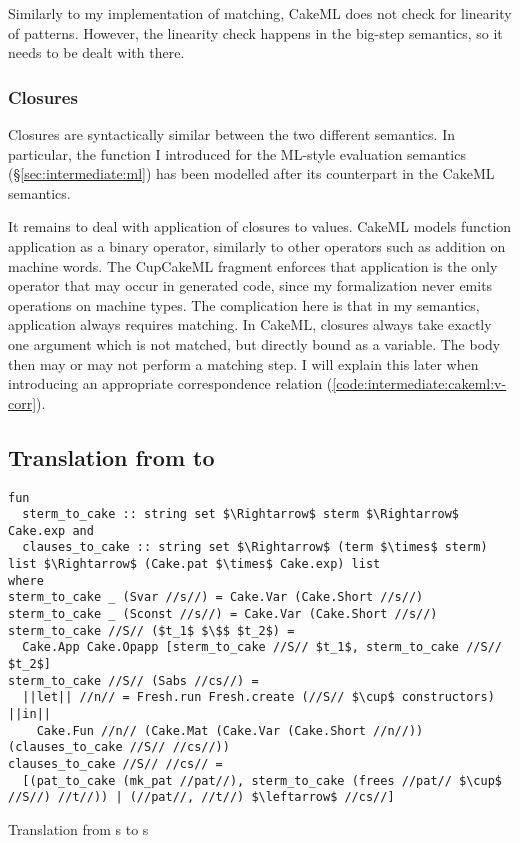 Similarly to my implementation of matching, CakeML does not check for linearity of patterns.
However, the linearity check happens in the big-step semantics, so it needs to be dealt with there.

\subsubsection{Closures}

Closures are syntactically similar between the two different semantics.
In particular, the  function I introduced for the ML-style evaluation semantics (§\ref{sec:intermediate:ml}) has been modelled after its counterpart in the CakeML semantics.

It remains to deal with application of closures to values.
CakeML models function application as a binary operator, similarly to other operators such as addition on machine words.
The CupCakeML fragment enforces that application is the only operator that may occur in generated code, since my formalization never emits operations on machine types.
The complication here is that in my semantics, application always requires matching.
In CakeML, closures always take exactly one argument which is not matched, but directly bound as a variable.
The body then may or may not perform a matching step.
I will explain this later when introducing an appropriate correspondence relation (\cref{code:intermediate:cakeml:v-corr}).

\subsection{Translation from  to }

\begin{code}
  \begin{lstlisting}[language=Isabelle]
fun
  sterm_to_cake :: string set $\Rightarrow$ sterm $\Rightarrow$ Cake.exp and
  clauses_to_cake :: string set $\Rightarrow$ (term $\times$ sterm) list $\Rightarrow$ (Cake.pat $\times$ Cake.exp) list
where
sterm_to_cake _ (Svar //s//) = Cake.Var (Cake.Short //s//)
sterm_to_cake _ (Sconst //s//) = Cake.Var (Cake.Short //s//)
sterm_to_cake //S// ($t_1$ $\$$ $t_2$) =
  Cake.App Cake.Opapp [sterm_to_cake //S// $t_1$, sterm_to_cake //S// $t_2$]
sterm_to_cake //S// (Sabs //cs//) =
  ||let|| //n// = Fresh.run Fresh.create (//S// $\cup$ constructors) ||in||
    Cake.Fun //n// (Cake.Mat (Cake.Var (Cake.Short //n//)) (clauses_to_cake //S// //cs//))
clauses_to_cake //S// //cs// =
  [(pat_to_cake (mk_pat //pat//), sterm_to_cake (frees //pat// $\cup$ //S//) //t//)) | (//pat//, //t//) $\leftarrow$ //cs//]\end{lstlisting}

  \caption{Translation from s to s}
  \label{code:intermediate:cakeml:translation}
\end{code}

